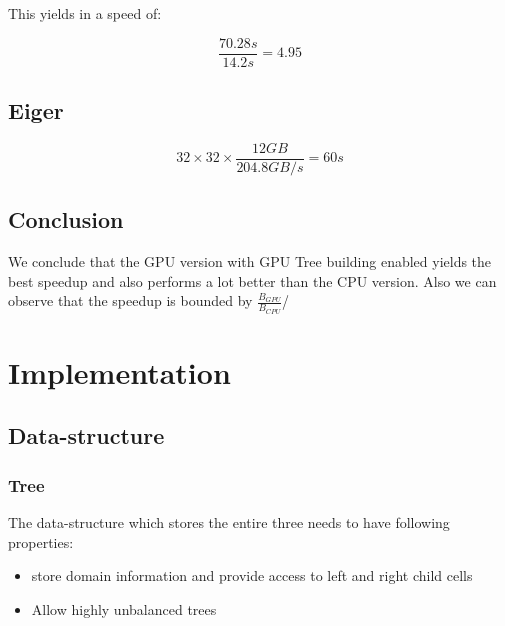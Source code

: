 \documentclass[]{article}
\begin{document}
This yields in a speed of:
\begin{center}
	\begin{equation}
		\frac{70.28s}{14.2s} = 4.95
	\end{equation}
\end{center}


\vspace{5mm}


\subsection{Eiger}

\begin{center}
	\begin{equation}
		32 \times 32 \times \frac{ 12 GB }{204.8 GB/s} = 60s
	\end{equation}
\end{center}

\subsection{Conclusion}

We conclude that the GPU version with GPU Tree building enabled yields the best speedup and also performs a lot better than the CPU version. Also we can observe that the speedup is bounded by $\frac{B_{GPU}}{B_{CPU}}$/ 

\section{Implementation}

\subsection{Data-structure}

\subsubsection{Tree}

The data-structure which stores the entire three needs to have following properties:

\begin{itemize}
	\item store domain information and provide access to left and right child cells
	\item Allow highly unbalanced trees
\end{itemize}
\end{document}
